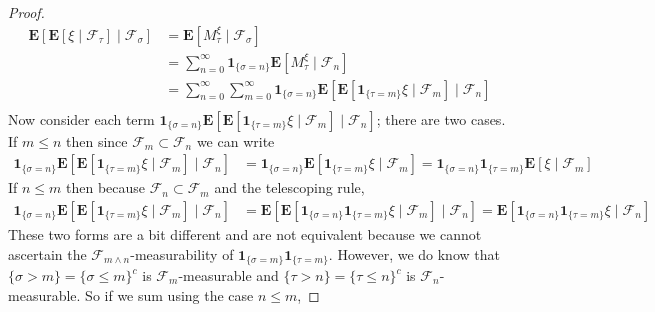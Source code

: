 \documentclass{amsbook}
\theoremstyle{definition}
\theoremstyle{remark}
\newcommand{\cexpectationlong}[2]{\textbf{E}\left[ #2 \mid #1 \right]}
\newcommand{\characteristic}[1]{\textbf{1}_{#1}}
\begin{document}
\begin{proof}
\begin{align*}
\cexpectationlong{\mathcal{F}_\sigma}{\cexpectationlong{\mathcal{F}_\tau}{\xi}}
&=
\cexpectationlong{\mathcal{F}_\sigma}{M^\xi_\tau}
\\
&= \sum_{n=0}^\infty \characteristic{\lbrace \sigma = n \rbrace}
\cexpectationlong{\mathcal{F}_n}{M^\xi_\tau} \\
&= \sum_{n=0}^\infty \sum_{m=0}^\infty \characteristic{\lbrace \sigma = n \rbrace}
\cexpectationlong{\mathcal{F}_n}{\cexpectationlong{\mathcal{F}_m}{\characteristic{
    \lbrace \tau = m \rbrace } \xi}} \\
\end{align*}
Now consider each term $\characteristic{\lbrace \sigma = n \rbrace}
\cexpectationlong{\mathcal{F}_n}{\cexpectationlong{\mathcal{F}_m}{\characteristic{
    \lbrace \tau = m \rbrace } \xi}}$; there are two cases. If $m \leq n$
then since $\mathcal{F}_m \subset \mathcal{F}_n$ we can write
\begin{align*}
\characteristic{\lbrace \sigma = n \rbrace}
\cexpectationlong{\mathcal{F}_n}{\cexpectationlong{\mathcal{F}_m}{\characteristic{
    \lbrace \tau = m \rbrace } \xi}} &= \characteristic{\lbrace \sigma = n \rbrace}\cexpectationlong{\mathcal{F}_m}{\characteristic{
    \lbrace \tau = m \rbrace } \xi} = \characteristic{\lbrace \sigma = n \rbrace}\characteristic{
    \lbrace \tau = m \rbrace }\cexpectationlong{\mathcal{F}_m}{ \xi} 
\end{align*}
If $n \leq m$ then because $\mathcal{F}_n \subset \mathcal{F}_m$ and
the telescoping rule,
\begin{align*}
\characteristic{\lbrace \sigma = n \rbrace}
\cexpectationlong{\mathcal{F}_n}{\cexpectationlong{\mathcal{F}_m}{\characteristic{
    \lbrace \tau = m \rbrace } \xi}} &= 
\cexpectationlong{\mathcal{F}_n}{\cexpectationlong{\mathcal{F}_m}{\characteristic{\lbrace
      \sigma = n \rbrace} \characteristic{
    \lbrace \tau = m \rbrace } \xi}}  = \cexpectationlong{\mathcal{F}_n}{\characteristic{\lbrace \sigma = n \rbrace}\characteristic{
    \lbrace \tau = m \rbrace } \xi} 
\end{align*}
These two forms are a bit different and are not equivalent because we
cannot ascertain the $\mathcal{F}_{m \wedge n}$-measurability of $\characteristic{\lbrace \sigma = m \rbrace}\characteristic{
    \lbrace \tau = m \rbrace }$.  However, we do know that $\lbrace
  \sigma > m \rbrace = \lbrace \sigma \leq m \rbrace^c$ is
  $\mathcal{F}_m$-measurable and $\lbrace
  \tau > n \rbrace = \lbrace \tau \leq n \rbrace^c$ is
  $\mathcal{F}_n$-measurable.  So if we sum using the case $n \leq m$,

\end{proof}
\end{document}
